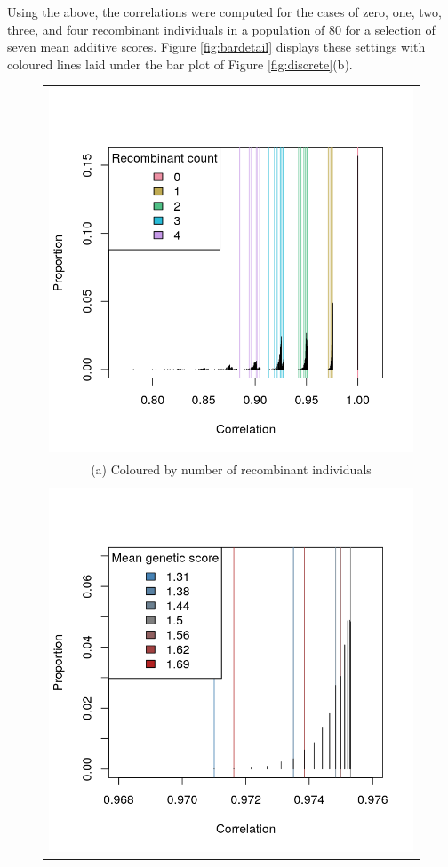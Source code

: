\documentclass[sts]{imsart}
\begin{document}
Using the above, the correlations were computed for the cases of zero, one, two, three, and four recombinant individuals in a population of 80 for a selection of seven mean additive scores. Figure \ref{fig:bardetail} displays these settings with coloured lines laid under the bar plot of Figure \ref{fig:discrete}(b).
\begin{figure}[htp]
  \begin{center}
    \begin{tabular}{c}
      \includegraphics[scale = 0.5]{../img/strngBar.png} \\ %
      {\footnotesize (a) Coloured by number of recombinant individuals} \\
      \\
      \includegraphics[scale = 0.5]{../img/strngBarClose.png} \\

\end{tabular}
\end{center}
\end{figure}
\end{document}
